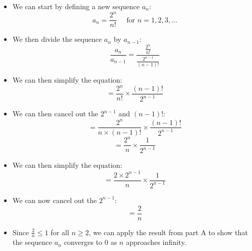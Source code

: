 \documentclass[12pt]{report}
\begin{document}
\begin{enumerate}[leftmargin=\labelsep]
\begin{enumerate}
\begin{tcolorbox}
\begin{itemize}[label={}]
                        \item We can start by defining a new sequence $a_n$:
                        \begin{equation*}
                            a_n = \frac{2^n}{n!} \quad \text{ for } n=1,2,3,\dots
                        \end{equation*}
                        \item We then divide the sequence $a_n$ by $a_{n-1}$:
                        \begin{equation*} \frac{a_n}{a_{n-1}} = \frac{\frac{2^n}{n!}}{\frac{2^{n-1}}{(n-1)!}}
                        \end{equation*}
                        \item We can then simplify the equation:
                        \begin{equation*}
                           = \frac{2^n}{n!} \times \frac{(n-1)!}{2^{n-1}}
                        \end{equation*}
                        \item We can then cancel out the $2^{n-1}$ and $(n-1)!$:
                        \begin{equation*}
                            = \frac{2^n}{n \times (n-1)!} \times \frac{(n-1)!}{2^{n-1}}
                        \end{equation*}
                        \begin{equation*}
                            =\frac{2^n}{n} \times \frac{1}{2^{n-1}}
                        \end{equation*}
                        \item We can then simplify the equation:
                        \begin{equation*}
                            =\frac{2 \times 2^{n-1}}{n} \times \frac{1}{2^{n-1}}
                        \end{equation*}
                        \item We can now cancel out the $2^{n-1}$:
                        \begin{equation*}
                            =\frac{2}{n}
                        \end{equation*}
                        \item Since $\frac{2}{n} \leq 1$ for all $n \geq 2$, we can apply the result from part A to show that the sequence $a_n$ converges to 0 as $n$ approaches infinity.
                    \end{itemize}

\end{tcolorbox}
\end{enumerate}
\end{enumerate}
\end{document}
